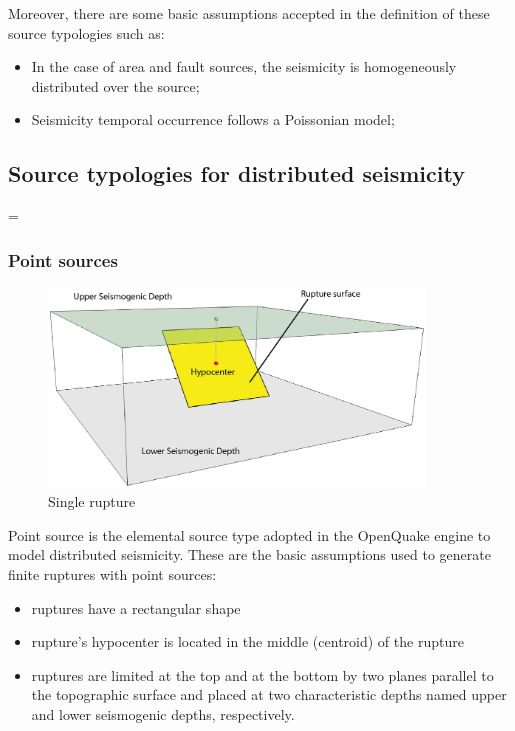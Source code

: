 Moreover, there are some basic assumptions accepted in the definition of these 
source typologies such as:
\begin{itemize}
	\item In the case of area and fault sources, the seismicity is homogeneously 
		distributed over the source; 	
	\item Seismicity temporal occurrence follows a Poissonian model; 
\end{itemize}
\subsection{Source typologies for distributed seismicity}
=\subsubsection{Point sources}
\label{hazard:seismic_source_types:pointSources}
\begin{figure}[!ht]
\centering
\includegraphics[width=10cm]{./figures/hazard/single_rupture.eps}
\caption{Single rupture}
\label{fig:single_rupture}
\end{figure}
Point source is the elemental source type adopted in the OpenQuake engine 
to model distributed seismicity. These are the basic assumptions used to 
generate finite ruptures with point sources:
\begin{itemize}
	\item ruptures have a rectangular shape
	\item rupture's hypocenter is located in the middle (centroid) of the rupture
	\item ruptures are limited at the top and at the bottom by two planes 
	parallel to the topographic surface and placed at two characteristic 
	depths named upper and lower seismogenic depths, respectively.
\end{itemize} 
